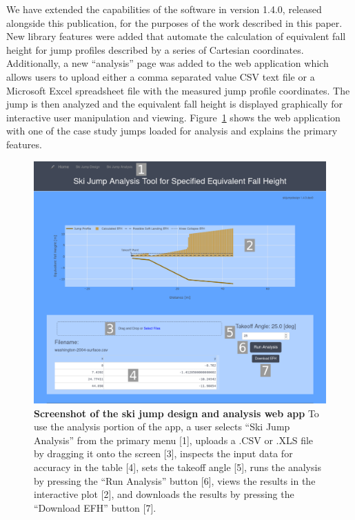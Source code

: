 \documentclass[smallextended]{svjour3}       %
\begin{document}
We have extended the capabilities of the software in version 1.4.0, released
alongside this publication, for the purposes of the work described in this
paper. New library features were added that automate the calculation of
equivalent fall height for jump profiles described by a series of Cartesian
coordinates. Additionally, a new ``analysis'' page was added to the web
application which allows users to upload either a comma separated value CSV
text file or a Microsoft Excel spreadsheet file with the measured jump profile
coordinates. The jump is then analyzed and the equivalent fall height is
displayed graphically for interactive user manipulation and viewing.
Figure~\ref{fig:web-app-screenshot} shows the web application with one of the
case study jumps loaded for analysis and explains the primary features.
%
\begin{figure}
  \centering
  \includegraphics[width=5.00in]{figures/web-app-screenshot.png}
  \caption{\textbf{Screenshot of the ski jump design and analysis web app} To
    use the analysis portion of the app, a user selects ``Ski Jump Analysis''
    from the primary menu [1], uploads a .CSV or .XLS file by dragging it onto
    the screen [3], inspects the input data for accuracy in the table [4], sets
    the takeoff angle [5], runs the analysis by pressing the ``Run Analysis''
    button [6], views the results in the interactive plot [2], and downloads
    the results by pressing the ``Download EFH'' button [7].}
  \label{fig:web-app-screenshot}
\end{figure}
\end{document}

